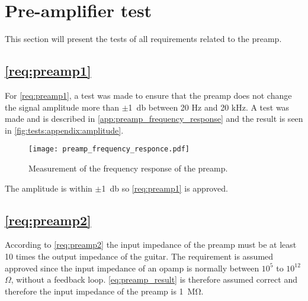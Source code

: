 \newpage
\section{Pre-amplifier test}
This section will present the tests of all requirements related to the \gls{preamp}. 


\subsection{\autoref{req:preamp1}}
For \autoref{req:preamp1}, a test was made to ensure that the \gls{preamp} does not change the signal amplitude more than $\pm$\SI{1}{\decibel} between 20 Hz and 20 kHz. A test was made and is described in \autoref{app:preamp_frequency_response} and the result is seen in \autoref{fig:tests:appendix:amplitude}.

\begin{figure}[htbp!]
	\centering
		\texttt{[image: preamp\_frequency\_responce.pdf]}
		\caption{Measurement of the frequency response of the \gls{preamp}.}
		\label{fig:tests:appendix:amplitude}
\end{figure}

The amplitude is within $\pm$\SI{1}{\decibel} so \autoref{req:preamp1} is approved.


\subsection{\autoref{req:preamp2}}
According to \autoref{req:preamp2} the input impedance of  the \gls{preamp} must be at least 10 times the output impedance of the guitar. The requirement is assumed approved since the input impedance of an \gls{opamp} is normally between $10^5$ to $10^{12}$ $\Omega$, without a feedback loop. \autoref{eq:preamp_result} is therefore assumed correct and therefore the input impedance of the \gls{preamp} is \SI{1}{\mega\ohm}.
%
%



